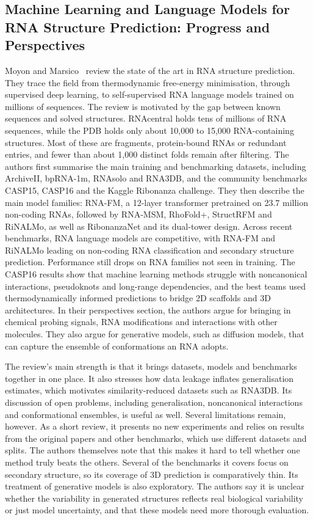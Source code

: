 \documentclass{FastFyp}
\begin{document}
\subsection{Machine Learning and Language Models for RNA Structure Prediction: Progress and Perspectives}
Moyon and Marsico~\cite{moyon2026ml} review the state of the art in RNA structure prediction. They trace the field from thermodynamic free-energy minimisation, through supervised deep learning, to self-supervised RNA language models trained on millions of sequences. The review is motivated by the gap between known sequences and solved structures. RNAcentral holds tens of millions of RNA sequences, while the PDB holds only about 10,000 to 15,000 RNA-containing structures. Most of these are fragments, protein-bound RNAs or redundant entries, and fewer than about 1,000 distinct folds remain after filtering. The authors first summarise the main training and benchmarking datasets, including ArchiveII, bpRNA-1m, RNAsolo and RNA3DB, and the community benchmarks CASP15, CASP16 and the Kaggle Ribonanza challenge. They then describe the main model families: RNA-FM, a 12-layer transformer pretrained on 23.7 million non-coding RNAs, followed by RNA-MSM, RhoFold+, StructRFM and RiNALMo, as well as RibonanzaNet and its dual-tower design. Across recent benchmarks, RNA language models are competitive, with RNA-FM and RiNALMo leading on non-coding RNA classification and secondary structure prediction. Performance still drops on RNA families not seen in training. The CASP16 results show that machine learning methods struggle with noncanonical interactions, pseudoknots and long-range dependencies, and the best teams used thermodynamically informed predictions to bridge 2D scaffolds and 3D architectures. In their perspectives section, the authors argue for bringing in chemical probing signals, RNA modifications and interactions with other molecules. They also argue for generative models, such as diffusion models, that can capture the ensemble of conformations an RNA adopts.

The review's main strength is that it brings datasets, models and benchmarks together in one place. It also stresses how data leakage inflates generalisation estimates, which motivates similarity-reduced datasets such as RNA3DB. Its discussion of open problems, including generalisation, noncanonical interactions and conformational ensembles, is useful as well. Several limitations remain, however. As a short review, it presents no new experiments and relies on results from the original papers and other benchmarks, which use different datasets and splits. The authors themselves note that this makes it hard to tell whether one method truly beats the others. Several of the benchmarks it covers focus on secondary structure, so its coverage of 3D prediction is comparatively thin. Its treatment of generative models is also exploratory. The authors say it is unclear whether the variability in generated structures reflects real biological variability or just model uncertainty, and that these models need more thorough evaluation.
\end{document}
